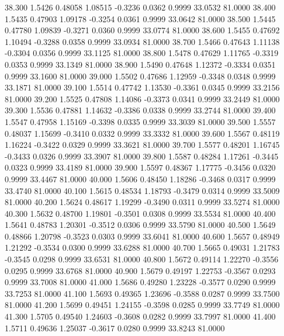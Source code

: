   38.300   1.5426   0.48058   1.08515  -0.3236   0.0362   0.9999  33.0532  81.0000
  38.400   1.5435   0.47903   1.09178  -0.3254   0.0361   0.9999  33.0642  81.0000
  38.500   1.5445   0.47780   1.09839  -0.3271   0.0360   0.9999  33.0774  81.0000
  38.600   1.5455   0.47692   1.10494  -0.3288   0.0358   0.9999  33.0934  81.0000
  38.700   1.5466   0.47643   1.11138  -0.3304   0.0356   0.9999  33.1125  81.0000
  38.800   1.5478   0.47629   1.11765  -0.3319   0.0353   0.9999  33.1349  81.0000
  38.900   1.5490   0.47648   1.12372  -0.3334   0.0351   0.9999  33.1600  81.0000
  39.000   1.5502   0.47686   1.12959  -0.3348   0.0348   0.9999  33.1871  81.0000
  39.100   1.5514   0.47742   1.13530  -0.3361   0.0345   0.9999  33.2156  81.0000
  39.200   1.5525   0.47808   1.14086  -0.3373   0.0341   0.9999  33.2449  81.0000
  39.300   1.5536   0.47881   1.14632  -0.3386   0.0338   0.9999  33.2744  81.0000
  39.400   1.5547   0.47958   1.15169  -0.3398   0.0335   0.9999  33.3039  81.0000
  39.500   1.5557   0.48037   1.15699  -0.3410   0.0332   0.9999  33.3332  81.0000
  39.600   1.5567   0.48119   1.16224  -0.3422   0.0329   0.9999  33.3621  81.0000
  39.700   1.5577   0.48201   1.16745  -0.3433   0.0326   0.9999  33.3907  81.0000
  39.800   1.5587   0.48284   1.17261  -0.3445   0.0323   0.9999  33.4189  81.0000
  39.900   1.5597   0.48367   1.17775  -0.3456   0.0320   0.9999  33.4467  81.0000
  40.000   1.5606   0.48450   1.18286  -0.3468   0.0317   0.9999  33.4740  81.0000
  40.100   1.5615   0.48534   1.18793  -0.3479   0.0314   0.9999  33.5009  81.0000
  40.200   1.5624   0.48617   1.19299  -0.3490   0.0311   0.9999  33.5274  81.0000
  40.300   1.5632   0.48700   1.19801  -0.3501   0.0308   0.9999  33.5534  81.0000
  40.400   1.5641   0.48783   1.20301  -0.3512   0.0306   0.9999  33.5790  81.0000
  40.500   1.5649   0.48866   1.20798  -0.3523   0.0303   0.9999  33.6041  81.0000
  40.600   1.5657   0.48949   1.21292  -0.3534   0.0300   0.9999  33.6288  81.0000
  40.700   1.5665   0.49031   1.21783  -0.3545   0.0298   0.9999  33.6531  81.0000
  40.800   1.5672   0.49114   1.22270  -0.3556   0.0295   0.9999  33.6768  81.0000
  40.900   1.5679   0.49197   1.22753  -0.3567   0.0293   0.9999  33.7008  81.0000
  41.000   1.5686   0.49280   1.23228  -0.3577   0.0290   0.9999  33.7253  81.0000
  41.100   1.5693   0.49365   1.23696  -0.3588   0.0287   0.9999  33.7500  81.0000
  41.200   1.5699   0.49451   1.24155  -0.3598   0.0285   0.9999  33.7749  81.0000
  41.300   1.5705   0.49540   1.24603  -0.3608   0.0282   0.9999  33.7997  81.0000
  41.400   1.5711   0.49636   1.25037  -0.3617   0.0280   0.9999  33.8243  81.0000
